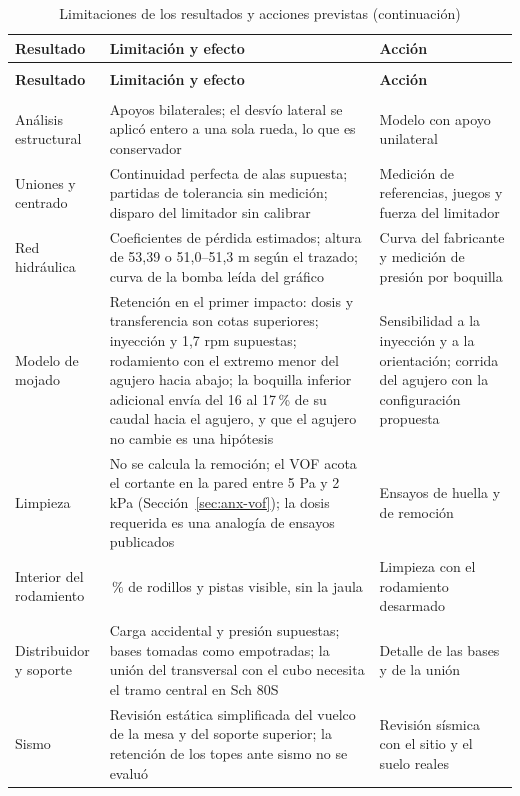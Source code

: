 \begingroup
\small\singlespacing
\setlength{\tabcolsep}{4pt}
\begin{longtable}{@{}>{\raggedright\arraybackslash}p{2.8cm}>{\raggedright\arraybackslash}p{}>{\raggedright\arraybackslash}p{}@{}}
\caption{Limitaciones de los resultados y acciones previstas}\label{tab:limitaciones-resultados}\\
\toprule
\textbf{Resultado} & \textbf{Limitación y efecto} & \textbf{Acción}\\
\midrule\endfirsthead
\caption[]{Limitaciones de los resultados y acciones previstas (continuación)}\\
\toprule
\textbf{Resultado} & \textbf{Limitación y efecto} & \textbf{Acción}\\
\midrule\endhead
\midrule\multicolumn{3}{r}{\textit{Continúa en la página siguiente.}}\\\endfoot
\bottomrule\endlastfoot
Análisis estructural & Apoyos bilaterales; el desvío lateral se aplicó entero a una sola rueda, lo que es conservador & Modelo con apoyo unilateral\\
Uniones y centrado & Continuidad perfecta de alas supuesta; partidas de tolerancia sin medición; disparo del limitador sin calibrar & Medición de referencias, juegos y fuerza del limitador\\
Red hidráulica & Coeficientes de pérdida estimados; altura de 53,39 o 51,0--51,3 m según el trazado; curva de la bomba leída del gráfico & Curva del fabricante y medición de presión por boquilla\\
Modelo de mojado & Retención en el primer impacto: dosis y transferencia son cotas superiores; inyección y 1,7 rpm supuestas; rodamiento con el extremo menor del agujero hacia abajo; la boquilla inferior adicional envía del 16 al 17\,\% de su caudal hacia el agujero, y que el agujero no cambie es una hipótesis & Sensibilidad a la inyección y a la orientación; corrida del agujero con la configuración propuesta\\
Limpieza & No se calcula la remoción; el VOF acota el cortante en la pared entre 5 Pa y 2 kPa (Sección~\ref{sec:anx-vof}); la dosis requerida es una analogía de ensayos publicados & Ensayos de huella y de remoción\\
Interior del rodamiento & 24\,\% de rodillos y pistas visible, sin la jaula & Limpieza con el rodamiento desarmado\\
Distribuidor y soporte & Carga accidental y presión supuestas; bases tomadas como empotradas; la unión del transversal con el cubo necesita el tramo central en Sch 80S & Detalle de las bases y de la unión\\
Sismo & Revisión estática simplificada del vuelco de la mesa y del soporte superior; la retención de los topes ante sismo no se evaluó & Revisión sísmica con el sitio y el suelo reales\\
\end{longtable}
\endgroup

